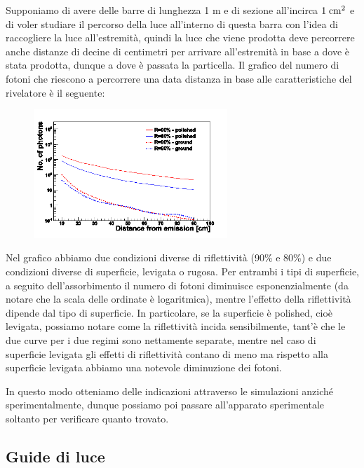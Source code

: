 \begin{esempio}
   Supponiamo di avere delle barre di lunghezza 1 m e di sezione all'incirca $1 \; \rm cm^2$ e di voler studiare il percorso della luce all'interno di questa barra con l'idea di raccogliere la luce all'estremità, quindi la luce che viene prodotta deve percorrere anche distanze di decine di centimetri per arrivare all'estremità in base a dove è stata prodotta, dunque a dove è passata la particella. Il grafico del numero di fotoni che riescono a percorrere una data distanza in base alle caratteristiche del rivelatore è il seguente:
   \begin{figure}[H]
      \centering
      \includegraphics[width=0.65\textwidth]{immagini/grafico_numero_fotoni.png}
   \end{figure}
   Nel grafico abbiamo due condizioni diverse di riflettività (90\% e 80\%) e due condizioni diverse di superficie, levigata o rugosa. Per entrambi i tipi di superficie, a seguito dell'assorbimento il numero di fotoni diminuisce esponenzialmente (da notare che la scala delle ordinate è logaritmica), mentre l'effetto della riflettività dipende dal tipo di superficie. In particolare, se la superficie è polished, cioè levigata, possiamo notare come la riflettività incida sensibilmente, tant'è che le due curve per i due regimi sono nettamente separate, mentre nel caso di superficie levigata gli effetti di riflettività contano di meno ma rispetto alla superficie levigata abbiamo una notevole diminuzione dei fotoni.
   
   In questo modo otteniamo delle indicazioni attraverso le simulazioni anziché sperimentalmente, dunque possiamo poi passare all'apparato sperimentale soltanto per verificare quanto trovato.
\end{esempio}

\subsection{Guide di luce}

